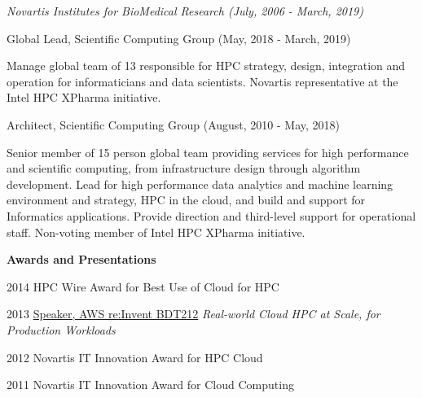 \documentclass[11pt,article,oneside]{memoir}
\begin{document}
\vspace{-0.075in}

\normalsize

\bigskip
\noindent\emph{Novartis Institutes for BioMedical Research (July, 2006 - March, 2019) \vspace{0.01in}}

\ind \footnotesize Global Lead, Scientific Computing Group (May, 2018 - March, 2019)

\ind \hspace{0.35in} \footnotesize Manage global team of 13 responsible for HPC strategy, design, integration and operation for informaticians and data scientists. Novartis representative at the Intel HPC XPharma initiative.

\medskip
\ind \footnotesize Architect, Scientific Computing Group (August, 2010 - May, 2018)


\ind \hspace{0.35in} \footnotesize Senior member of 15 person global team providing services for high performance and scientific computing, from infrastructure design through algorithm development. Lead for high performance data analytics and machine learning environment and strategy, HPC in the cloud, and build and support for Informatics applications. Provide direction and third-level support for operational staff. Non-voting member of Intel HPC XPharma initiative.

\medskip
\ind \hspace{0.35in} \footnotesize \textbf{Awards and Presentations}

\ind \hspace{0.35in} \footnotesize 2014 HPC Wire Award for Best Use of Cloud for HPC

\ind \hspace{0.35in} \footnotesize 2013 \href{https://www.youtube.com/watch?v=--ALfYpw_aM}{Speaker, AWS re:Invent BDT212} \emph{Real-world Cloud HPC at Scale, for Production Workloads}

\ind \hspace{0.35in} \footnotesize 2012 Novartis IT Innovation Award for HPC Cloud

\ind \hspace{0.35in} \footnotesize 2011 Novartis IT Innovation Award for Cloud Computing
\medskip
\end{document}
